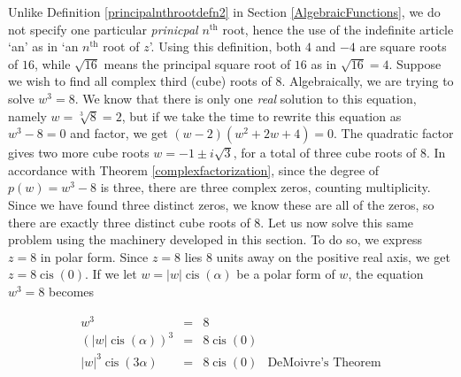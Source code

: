 Unlike Definition \ref{principalnthrootdefn2} in Section \ref{AlgebraicFunctions}, we do not specify one particular \textit{prinicpal} $n^{\text{th}}$ root, hence the use of the indefinite article `an' as in `an $n^{\text{th}}$ root of $z$'.  Using this definition, both $4$ and $-4$ are square roots of $16$, while $\sqrt{16}$ means the principal square root of $16$ as in $\sqrt{16}= 4$.  Suppose we wish to find all complex third (cube) roots of $8$.  Algebraically, we are trying to solve $w^{3} = 8$.  We know that there is only one \textit{real} solution to this equation, namely $w = \sqrt[3]{8} = 2$, but if we take the time to rewrite this equation as $w^3 - 8 = 0$ and factor, we get $(w-2)\left(w^2 + 2w + 4\right) = 0$.  The quadratic factor gives two more cube roots $w = -1 \pm i \sqrt{3}$, for a total of three cube roots of $8$. In accordance with Theorem \ref{complexfactorization}, since the degree of $p(w) = w^3 -8$ is three, there are three complex zeros, counting multiplicity.  Since we have found three distinct zeros, we know these are all of the zeros, so there are exactly three distinct cube roots of $8$.  Let us now solve this same problem using the machinery developed in this section.  To do so, we express $z = 8$ in polar form. Since $z=8$ lies $8$ units away on the positive real axis, we get $z = 8 \operatorname{cis}(0)$.  If we let $w = |w| \operatorname{cis}(\alpha)$ be a polar form of $w$, the equation $w^3 = 8$ becomes

\[ \begin{array}{rcll}

w^3 & = & 8 & \\[3pt]
\left(|w| \operatorname{cis}(\alpha)\right)^3 & = & 8 \operatorname{cis}(0) & \\[3pt]
|w|^3 \operatorname{cis}(3\alpha) & = & 8 \operatorname{cis}(0) & \text{DeMoivre's Theorem} \\[3pt]

\end{array}\]


